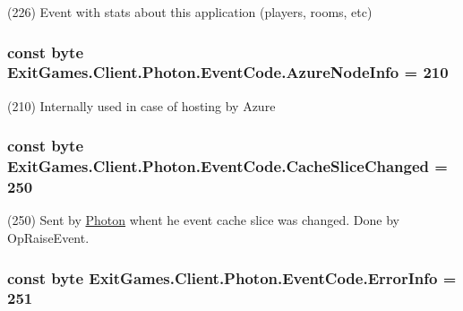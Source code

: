 (226) Event with stats about this application (players, rooms, etc)

\subsubsection[{\texorpdfstring{Azure\+Node\+Info}{AzureNodeInfo}}]{\setlength{\rightskip}{0pt plus 5cm}const byte Exit\+Games.\+Client.\+Photon.\+Event\+Code.\+Azure\+Node\+Info = 210}\hypertarget{class_exit_games_1_1_client_1_1_photon_1_1_event_code_aac53b6b53140c724713d30add1c116cf}{}\label{class_exit_games_1_1_client_1_1_photon_1_1_event_code_aac53b6b53140c724713d30add1c116cf}


(210) Internally used in case of hosting by Azure

\subsubsection[{\texorpdfstring{Cache\+Slice\+Changed}{CacheSliceChanged}}]{\setlength{\rightskip}{0pt plus 5cm}const byte Exit\+Games.\+Client.\+Photon.\+Event\+Code.\+Cache\+Slice\+Changed = 250}\hypertarget{class_exit_games_1_1_client_1_1_photon_1_1_event_code_ae7cdbabb27d642ad791221180e5ff1f0}{}\label{class_exit_games_1_1_client_1_1_photon_1_1_event_code_ae7cdbabb27d642ad791221180e5ff1f0}


(250) Sent by \hyperlink{namespace_exit_games_1_1_client_1_1_photon}{Photon} whent he event cache slice was changed. Done by Op\+Raise\+Event.

\subsubsection[{\texorpdfstring{Error\+Info}{ErrorInfo}}]{\setlength{\rightskip}{0pt plus 5cm}const byte Exit\+Games.\+Client.\+Photon.\+Event\+Code.\+Error\+Info = 251}\hypertarget{class_exit_games_1_1_client_1_1_photon_1_1_event_code_a5515318245655c141be84934f461053c}{}\label{class_exit_games_1_1_client_1_1_photon_1_1_event_code_a5515318245655c141be84934f461053c}


